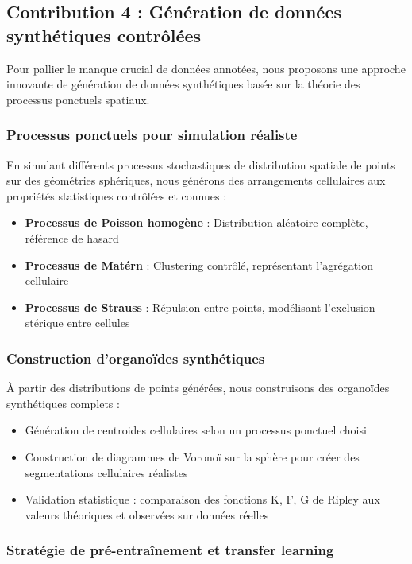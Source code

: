 \subsection{Contribution 4 : Génération de données synthétiques contrôlées}

Pour pallier le manque crucial de données annotées, nous proposons une approche innovante de génération de données synthétiques basée sur la théorie des processus ponctuels spatiaux.

\subsubsection{Processus ponctuels pour simulation réaliste}

En simulant différents processus stochastiques de distribution spatiale de points~\cite{Illian2008,Diggle2013} sur des géométries sphériques, nous générons des arrangements cellulaires aux propriétés statistiques contrôlées et connues :

\begin{itemize}
    \item \textbf{Processus de Poisson homogène} : Distribution aléatoire complète, référence de hasard
    \item \textbf{Processus de Matérn} : Clustering contrôlé, représentant l'agrégation cellulaire
    \item \textbf{Processus de Strauss} : Répulsion entre points, modélisant l'exclusion stérique entre cellules
\end{itemize}

\subsubsection{Construction d'organoïdes synthétiques}

À partir des distributions de points générées, nous construisons des organoïdes synthétiques complets :
\begin{itemize}
    \item Génération de centroides cellulaires selon un processus ponctuel choisi
    \item Construction de diagrammes de Voronoï sur la sphère pour créer des segmentations cellulaires réalistes
    \item Validation statistique : comparaison des fonctions K, F, G de Ripley aux valeurs théoriques et observées sur données réelles
\end{itemize}

\subsubsection{Stratégie de pré-entraînement et transfer learning}

